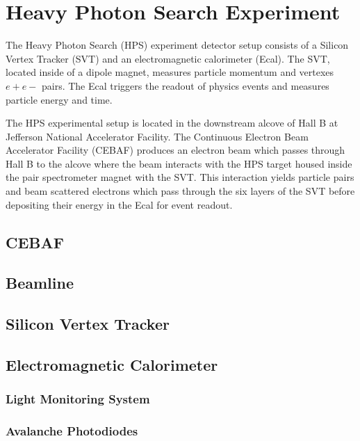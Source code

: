\documentclass[12pt]{report}
\begin{document}
\chapter{Heavy Photon Search Experiment}
The Heavy Photon Search (HPS) experiment detector setup consists of a Silicon Vertex Tracker (SVT) and an electromagnetic calorimeter (Ecal). The SVT, located inside of a dipole magnet, measures particle momentum and vertexes $e+e-$ pairs. The Ecal triggers the readout of physics events and measures particle energy and time. \par
The HPS experimental setup is located in the downstream alcove of Hall B at Jefferson National Accelerator Facility. The Continuous Electron Beam Accelerator Facility (CEBAF) produces an electron beam which passes through Hall B to the alcove where the beam interacts with the HPS target housed inside the pair spectrometer magnet with the SVT. This interaction yields particle pairs and beam scattered electrons which pass through the six layers of the SVT before depositing their energy in the Ecal for event readout.

\section{CEBAF}


\section{Beamline}


\section{Silicon Vertex Tracker}


\section{Electromagnetic Calorimeter}


\subsection{Light Monitoring System}


\subsection{Avalanche Photodiodes}

\end{document}
